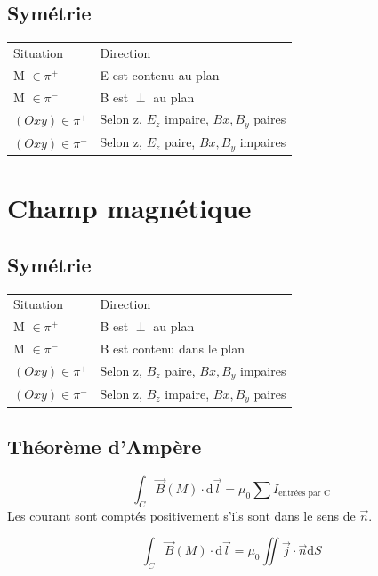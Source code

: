 \documentclass[french]{yLectureNote}
\renewcommand{\vec}{\overrightarrow}
\newcommand{\dd}{\mathrm{d}}
\newcommand{\B}{\vec{B}(M)}
\newcommand{\pip}{\pi^+}
\newcommand{\pim}{\pi^-}
\begin{document}
\subsection{Symétrie}
\begin{center}
\begin{tabular}{ll}
Situation & Direction\\
M \(\in \pip\) & E est contenu au plan\\
M \(\in \pim\) & B est \(\perp\) au plan\\
\( (Oxy) \in  \pip\) & Selon z, \(E_z\) impaire, \(Bx,B_y\) paires\\
\( (Oxy) \in  \pim\) & Selon z, \(E_z\) paire, \(Bx,B_y\) impaires
\end{tabular}
\end{center}
\section{Champ magnétique}
\subsection{Symétrie}
\begin{center}
\begin{tabular}{ll}
Situation & Direction\\
M \(\in \pip\) & B est \(\perp\) au plan\\
M \(\in \pim\) & B est contenu dans le plan\\
\( (Oxy) \in  \pip\) & Selon z, \(B_z\) paire, \(Bx,B_y\) impaires\\
\( (Oxy) \in  \pim\) & Selon z, \(B_z\) impaire, \(Bx,B_y\) paires
\end{tabular}
\end{center}
\subsection{Théorème d'Ampère}
\begin{theorem}
\[\int_C \vec{B}(M)\cdot \dd \vec{l} = \mu_0 \sum I_{\text{entrées par C}} \]
Les courant sont comptés positivement s'ils sont dans le sens de \(\vec{n}\).
\end{theorem}

\begin{theorem}
 \[\int_C\B\cdot \dd \vec{l} = \mu_0 \iint \vec{j}\cdot \vec{n}\dd S\]
\end{theorem}
\end{document}
